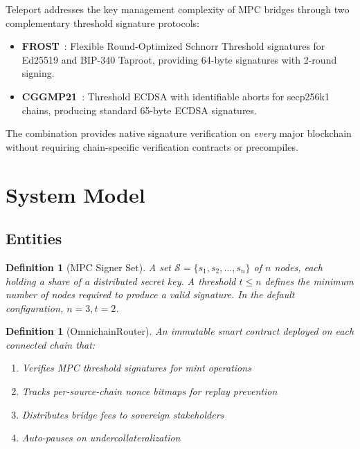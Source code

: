 \documentclass[11pt,twocolumn]{article}
\newtheorem{definition}[theorem]{Definition}
\begin{document}
Teleport addresses the key management complexity of MPC bridges through two complementary threshold signature protocols:

\begin{itemize}[nosep]
  \item \textbf{FROST}~\cite{frost}: Flexible Round-Optimized Schnorr Threshold signatures for Ed25519 and BIP-340 Taproot, providing 64-byte signatures with 2-round signing.
  \item \textbf{CGGMP21}~\cite{cggmp21}: Threshold ECDSA with identifiable aborts for secp256k1 chains, producing standard 65-byte ECDSA signatures.
\end{itemize}

The combination provides native signature verification on \emph{every} major blockchain without requiring chain-specific verification contracts or precompiles.

\section{System Model}

\subsection{Entities}

\begin{definition}[MPC Signer Set]
A set $\mathcal{S} = \{s_1, s_2, \ldots, s_n\}$ of $n$ nodes, each holding a share of a distributed secret key. A threshold $t \leq n$ defines the minimum number of nodes required to produce a valid signature. In the default configuration, $n = 3, t = 2$.
\end{definition}

\begin{definition}[OmnichainRouter]
An immutable smart contract deployed on each connected chain that:
\begin{enumerate}[nosep]
  \item Verifies MPC threshold signatures for mint operations
  \item Tracks per-source-chain nonce bitmaps for replay prevention
  \item Distributes bridge fees to sovereign stakeholders
  \item Auto-pauses on undercollateralization
\end{enumerate}
\end{definition}
\end{document}

